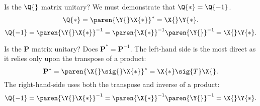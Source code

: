 Is the $\Q{}$ matrix unitary? We must demonstrate that $\Q{*}=\Q{-1}$.
\begin{equation}
  \Q{*} = \paren{\Y{}\X{*}}^{*} = \X{}\Y{*}.
\end{equation}
\begin{equation}
  \Q{-1} = \paren{\Y{}\X{*}}^{\mathrm{-1}} = \paren{\X{*}}^{\mathrm{-1}}\paren{\Y{}}^{\mathrm{-1}} = \X{}\Y{*}.
\end{equation}


Is the $\mathbf{P}$ matrix unitary? Does $\mathbf{P}^{*}=\mathbf{P}^{-1}$. The left-hand side is the most direct as it relies only upon the transpose of a product:
\begin{equation}
  \mathbf{P}^{*} = \paren{\X{}\sig{}\X{*}}^{*} = \X{*}\sig{T}\X{}.
\end{equation}
The right-hand-side uses both the transpose and inverse of a product:
\begin{equation}
  \Q{-1} = \paren{\Y{}\X{*}}^{\mathrm{-1}} = \paren{\X{*}}^{\mathrm{-1}}\paren{\Y{}}^{\mathrm{-1}} = \X{}\Y{*}.
\end{equation}



\endinput